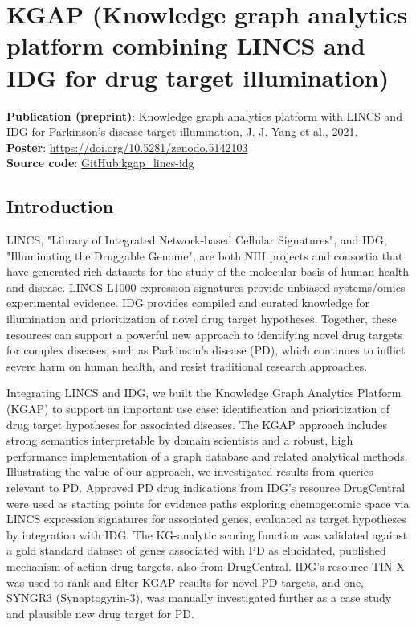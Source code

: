 \chapter{KGAP (Knowledge graph analytics platform combining LINCS and IDG for drug target illumination)}

\textbf{Publication (preprint)}: Knowledge graph analytics platform with LINCS and IDG for Parkinson’s disease target illumination, J. J. Yang et al., 2021\cite{Yang2021-yv}.\\
\textbf{Poster}: \href{https://doi.org/10.5281/zenodo.5142103}{https://doi.org/10.5281/zenodo.5142103}\\
\textbf{Source code}: \href{https://github.com/IUIDSL/kgap\_lincs-idg}{GitHub:kgap\_lincs-idg}

\section{Introduction}

LINCS, "Library of Integrated Network-based Cellular Signatures", and IDG, "Illuminating the Druggable Genome", are both NIH projects and consortia that have generated rich datasets for the study of the molecular basis of human health and disease.  LINCS L1000 expression signatures provide unbiased systems/omics experimental evidence. IDG provides compiled and curated knowledge for illumination and prioritization of novel drug target hypotheses. Together, these resources can support a powerful new approach to identifying novel drug targets for complex diseases, such as Parkinson's disease (PD), which continues to inflict severe harm on human health, and resist traditional research approaches.

Integrating LINCS and IDG, we built the Knowledge Graph Analytics Platform (KGAP) to support an important use case: identification and prioritization of drug target hypotheses for associated diseases. The KGAP approach includes strong semantics interpretable by domain scientists and a robust, high performance implementation of a graph database and related analytical methods. Illustrating the value of our approach, we investigated results from queries relevant to PD. Approved PD drug indications from IDG’s resource DrugCentral were used as starting points for evidence paths exploring chemogenomic space via LINCS expression signatures for associated genes, evaluated as target hypotheses by integration with IDG. The KG-analytic scoring function was validated against a gold standard dataset of genes associated with PD as elucidated, published mechanism-of-action drug targets, also from DrugCentral. IDG's resource TIN-X was used to rank and filter KGAP results for novel PD targets, and one, SYNGR3 (Synaptogyrin-3), was manually investigated further as a case study and plausible new drug target for PD.

